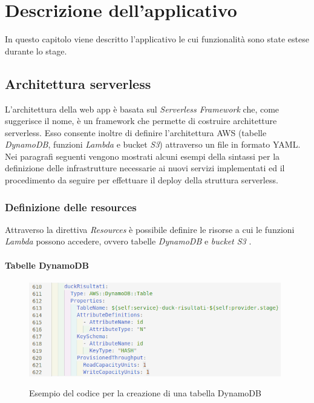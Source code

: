 
\chapter{Descrizione dell'applicativo}
\label{cap:applicazione}

In questo capitolo viene descritto l'applicativo le cui funzionalità sono state estese durante lo stage.\\

\section{Architettura serverless}
L'architettura della web app è basata sul \emph{Serverless Framework} che, come suggerisce il nome, è un \gls{framework} che permette di costruire architetture \gls{serverless}. Esso consente inoltre di definire l'architettura \gls{AWS} (tabelle \emph{DynamoDB}, funzioni \emph{Lambda} e bucket \emph{S3}) attraverso un file in formato \gls{YAML}. \\
 Nei paragrafi seguenti vengono mostrati alcuni esempi della sintassi per la definizione delle infrastrutture necessarie ai nuovi servizi implementati ed il procedimento da seguire per effettuare il \gls{deploy} della struttura \gls{serverless}.
	\subsection{Definizione delle resources}
	Attraverso la direttiva \emph{Resources} è possibile definire le risorse a cui le funzioni \emph{Lambda} possono accedere, ovvero tabelle \emph{DynamoDB} e \emph{bucket S3} .
	
		\subsubsection{Tabelle DynamoDB}
		\begin{figure}[H]
			\centering
			\includegraphics[width=11cm]{immagini/tabellaDB.png} \\
			\caption{\label{fig:tabellaDB} Esempio del codice per la creazione di una tabella DynamoDB}
		\end{figure}
		
